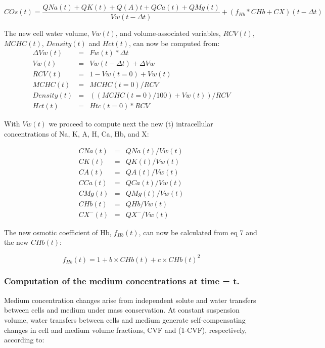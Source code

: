 \documentclass[a4paper]{article}
\newcommand{\cell}[1]{C#1}
\newcommand{\CNa}{\cell{Na}}
\newcommand{\CK}{\cell{K}}
\newcommand{\CA}{\cell{A}}
\newcommand{\CHb}{\cell{Hb}}
\newcommand{\CCa}{\cell{Ca}}
\newcommand{\CMg}{\cell{Mg}}
\newcommand{\CX}{\cell{X}}
\begin{document}
\begin{equation}
COs(t) = \frac{QNa(t) + QK(t) + Q(A)t + QCa(t) + QMg(t)}{Vw(t-\Delta t)}  + (f_{Hb}*\CHb + \CX )(t-\Delta t)
\end{equation}


\setcounter{equation}{0}
\renewcommand{\theequation}{23\alph{equation}}

The new cell water volume, $Vw(t)$, and volume-associated variables, $RCV(t)$, $MCHC(t)$, $Density(t)$ and $Hct(t)$, can now be computed from: 
\begin{eqnarray}
\Delta Vw(t) &=& Fw(t)*\Delta t \\
Vw(t) &=& Vw(t-\Delta t) + \Delta Vw \\
RCV(t) &=& 1-Vw(t=0) + Vw(t)  \\
MCHC(t) &=& MCHC(t=0)/RCV  \\
Density(t) &=& ((MCHC(t=0)/100) + Vw(t))/RCV  \\
Hct(t) &=& Htc(t=0)*RCV  
\end{eqnarray}

With $Vw(t)$ we proceed to compute next the new (t) intracellular concentrations of Na, K, A, H, Ca, Hb, and X:

\setcounter{equation}{0}
\renewcommand{\theequation}{24\alph{equation}}

\begin{eqnarray}
\CNa(t) &=& QNa(t)/Vw(t) \\
\CK(t) &=& QK(t)/Vw(t) \\
\CA(t) &=& QA(t)/Vw(t)  \\
\CCa(t) &=& QCa(t)/Vw(t)  \\
\CMg(t) &=& QMg(t)/Vw(t)  \\
\CHb(t) &=& QHb/Vw(t) \\
\CX^{-}(t) &=& QX^{-} /Vw(t)  
\end{eqnarray}

The new osmotic coefficient of Hb, $f_{Hb}(t)$, can now be calculated from eq 7 and the new $\CHb(t)$:

\setcounter{equation}{24}
\renewcommand{\theequation}{\arabic{equation}}

\begin{equation}
f_{Hb}(t) = 1 + b\times\CHb(t) + c\times CHb(t)^2
\end{equation}

\subsubsection{Computation of the medium concentrations at time = t.}
Medium concentration changes arise from independent solute and water transfers between cells and medium under mass conservation.  At constant suspension volume, water transfers between cells and medium generate self-compensating changes in cell and medium volume fractions, CVF and (1-CVF), respectively, according to:
\end{document}
